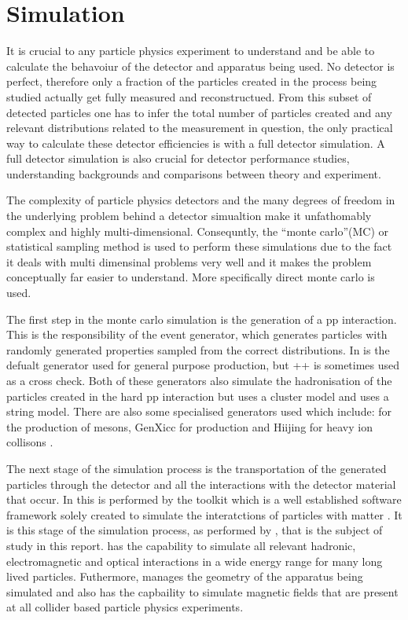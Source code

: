 
\section{Simulation}
\label{sec:Simulation}
It is crucial to any particle physics experiment to understand and be able to calculate the behavoiur of the detector and apparatus being used.  No detector is perfect, therefore only a fraction of the particles created in the process being studied actually get fully measured and reconstructued.  From this subset of detected particles one has to infer the total number of particles created and any relevant distributions related to the measurement in question, the only practical way to calculate these detector efficiencies is with a full detector simulation.  A full detector simulation is also crucial for detector performance studies, understanding backgrounds and comparisons between theory and experiment.

The complexity of particle physics detectors and the many degrees of freedom in the underlying problem behind a detector simualtion make it unfathomably complex and highly multi-dimensional.  Consequntly, the ``monte carlo''(MC) or statistical sampling method is used to perform these simulations due to the fact it deals with multi dimensinal problems very well and it makes the problem conceptually far easier to understand.  More specifically direct monte carlo is used.

The first step in the monte carlo simulation is the generation of a pp interaction.  This is the responsibility of the event generator, which generates particles with randomly generated properties sampled from the correct distributions.  In \lhcb \pythia is the defualt generator used for general purpose production, but \herwig++ is sometimes used as a cross check\cite{Sjostrand:2007gs,Herwig}.  Both of these generators also simulate the hadronisation of the particles created in the hard pp interaction but \herwig uses a cluster model and \pythia uses a string model.  There are also some specialised generators used which include: \bcvegpy for the production of \Bc mesons, GenXicc for \Xic production and Hiijing for heavy ion collisons \cite{bcvegpy,Gyulassy:1994ew,Chang:2007pp}.

The next stage of the simulation process is the transportation of the generated particles through the detector and all the interactions with the detector material that occur.  In \lhcb this is performed by the \geant toolkit which is a well established software framework solely created to simulate the interatctions of particles with matter \cite{Agostinelli:2002hh}.  It is this stage of the simulation process, as performed by \geant, that is the subject of study in this report.  \geant has the capability to simulate all relevant hadronic, electromagnetic and optical interactions in a wide energy range for many long lived particles. Futhermore, \geant manages the geometry of the apparatus being simulated and also has the capbaility to simulate magnetic fields that are present at all collider based particle physics experiments.

